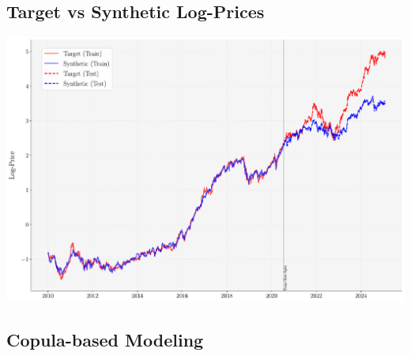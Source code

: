 \documentclass[
  letterpaper,
  DIV=11,
  numbers=noendperiod]{scrartcl}
\begin{document}
\subsection{Target vs Synthetic
Log-Prices}\label{target-vs-synthetic-log-prices}

\begin{center}
\includegraphics[width=1\linewidth,height=\textheight,keepaspectratio]{simple_Presentation_files/mediabag/images/converted/target_synthetic_prices_NVDA.pdf}
\end{center}

\subsection{Copula-based Modeling}\label{copula-based-modeling}
\end{document}
